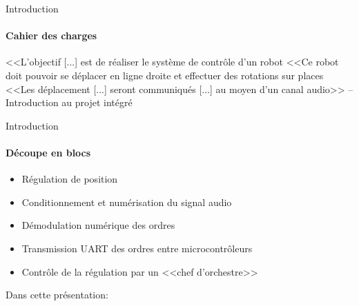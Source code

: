 \begin{frame}{Introduction}
\framesubtitle{Cahier des charges}
\large
<<L'objectif [...] est de réaliser le système de contrôle d'un robot
\vfill
<<Ce robot doit pouvoir se déplacer en ligne droite et effectuer des rotations sur places
\vfill
<<Les déplacement [...] seront communiqués [...] au moyen d'un canal audio>>
\vfill
\hspace{5em}--Introduction au projet intégré
\end{frame}


\begin{frame}{Introduction}
  \framesubtitle{Découpe en blocs}
  \begin{itemize}
    \item Régulation de position
    \item Conditionnement et numérisation du signal audio
    \item Démodulation numérique des ordres
    \item Transmission UART des ordres entre microcontrôleurs
    \item Contrôle de la régulation par un <<chef d'orchestre>>
  \end{itemize}
\end{frame}

\begin{frame}{Dans cette présentation:}
  \tableofcontents
\end{frame}
